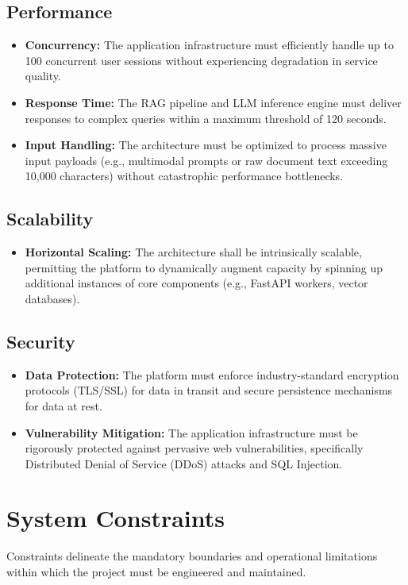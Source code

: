 \subsection{Performance}
\begin{itemize}
    \item \textbf{Concurrency:} The application infrastructure must efficiently handle up to 100 concurrent user sessions without experiencing degradation in service quality.
    \item \textbf{Response Time:} The RAG pipeline and LLM inference engine must deliver responses to complex queries within a maximum threshold of 120 seconds.
    \item \textbf{Input Handling:} The architecture must be optimized to process massive input payloads (e.g., multimodal prompts or raw document text exceeding 10,000 characters) without catastrophic performance bottlenecks.
\end{itemize}

\subsection{Scalability}
\begin{itemize}
    \item \textbf{Horizontal Scaling:} The architecture shall be intrinsically scalable, permitting the platform to dynamically augment capacity by spinning up additional instances of core components (e.g., FastAPI workers, vector databases).
\end{itemize}

\subsection{Security}
\begin{itemize}
    \item \textbf{Data Protection:} The platform must enforce industry-standard encryption protocols (TLS/SSL) for data in transit and secure persistence mechanisms for data at rest.
    \item \textbf{Vulnerability Mitigation:} The application infrastructure must be rigorously protected against pervasive web vulnerabilities, specifically Distributed Denial of Service (DDoS) attacks and SQL Injection.
\end{itemize}

\section{System Constraints}
Constraints delineate the mandatory boundaries and operational limitations within which the project must be engineered and maintained.

